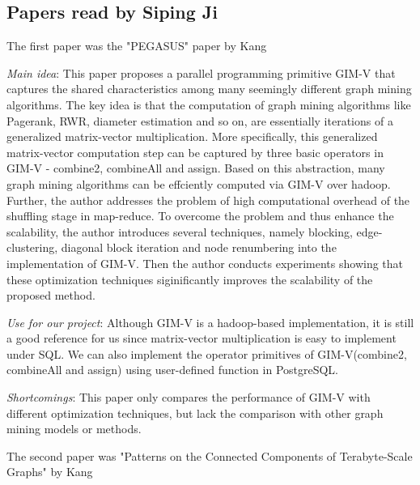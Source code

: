 \subsection{Papers read by Siping Ji}
The first paper was the "PEGASUS" paper by Kang
\cite{Kang09}
\begin{itemize*}
\item {\em Main idea}: 
		This paper proposes a parallel programming primitive GIM-V that captures the shared characteristics among many seemingly different graph mining algorithms. The key idea is that the computation of graph mining algorithms like Pagerank, RWR, diameter estimation and so on, are essentially iterations of a generalized matrix-vector multiplication. More specifically, this generalized matrix-vector computation step can be captured by three basic operators in GIM-V - combine2, combineAll and assign. Based on this abstraction, many graph mining algorithms can be effciently computed via GIM-V over hadoop. Further, the author addresses the problem of high computational overhead of the shuffling stage in map-reduce. To overcome the problem and thus enhance the scalability, the author introduces several techniques, namely blocking, edge-clustering, diagonal block iteration and node renumbering into the implementation of GIM-V. Then the author conducts experiments showing that these optimization techniques siginificantly improves the scalability of the proposed method. 
\item {\em Use for our project}:
      Although GIM-V is a hadoop-based implementation, it is still a good reference for us since matrix-vector multiplication is easy to implement under SQL.  We can also implement the operator primitives of GIM-V(combine2, combineAll and assign) using user-defined function in PostgreSQL.

\item {\em Shortcomings}: 
	This paper only compares the performance of GIM-V with 	different optimization techniques, but lack the comparison with other graph mining models or methods.
      
\end{itemize*}
The second paper was "Patterns on the Connected Components of Terabyte-Scale Graphs" by Kang
\cite{DBLP:conf/icdm/KangMAF10}

